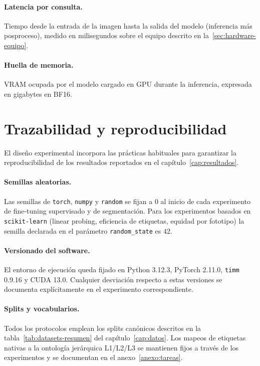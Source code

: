 \paragraph{Latencia por consulta.} Tiempo desde la entrada de la
imagen hasta la salida del modelo (inferencia más posproceso),
medido en milisegundos sobre el equipo descrito en
la~\ref{sec:hardware-equipo}.

\paragraph{Huella de memoria.} VRAM ocupada por el modelo cargado
en GPU durante la inferencia, expresada en gigabytes en BF16.

\section{Trazabilidad y reproducibilidad}
\label{sec:reproducibilidad}

El diseño experimental incorpora las prácticas habituales para
garantizar la reproducibilidad de los resultados reportados en el
capítulo~\ref{cap:resultados}.

\paragraph{Semillas aleatorias.} Las semillas de
\texttt{torch}, \texttt{numpy} y \texttt{random} se fijan a
$0$ al inicio de cada experimento de fine-tuning supervisado y de
segmentación. Para los experimentos basados en \texttt{scikit-learn}
(linear probing, eficiencia de etiquetas, equidad por fototipo) la
semilla declarada en el parámetro \texttt{random\_state} es
$42$.

\paragraph{Versionado del software.} El entorno de ejecución
queda fijado en Python 3.12.3, PyTorch 2.11.0, \texttt{timm}
0.9.16 y CUDA 13.0. Cualquier desviación respecto a estas
versiones se documenta explícitamente en el experimento
correspondiente.

\paragraph{Splits y vocabularios.} Todos los protocolos emplean
los splits canónicos descritos en la
tabla~\ref{tab:datasets-resumen} del capítulo~\ref{cap:datos}. Los
mapeos de etiquetas nativas a la ontología jerárquica L1/L2/L3 se
mantienen fijos a través de los experimentos y se documentan en el
anexo~\ref{anexo:tareas}.

